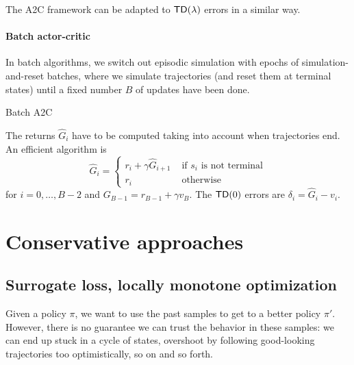 \documentclass[../course-notes.tex]{subfiles}
\begin{document}
The A2C framework can be adapted to $\mathsf{TD}(\lambda)$ errors in a similar way.


\paragraph{Batch actor-critic} In batch algorithms, we switch out episodic simulation with epochs of simulation-and-reset batches, where we simulate trajectories (and reset them at terminal states) until a fixed number $B$ of updates have been done.

\begin{algorithm}[H]
\caption{Batch A2C}\label{algo:BatchA2C}
\end{algorithm}

The returns $\widehat{G}_i$ have to be computed taking into account when trajectories end.
An efficient algorithm is
\[
	\widehat{G}_i =
	\begin{cases}
	r_i + \gamma \widehat{G}_{i+1}& \text{ if } s_i \text{ is not terminal} \\
	r_i & \text{ otherwise}
	\end{cases}
\]
for $i=0,\ldots,B-2$ and $G_{B-1} = r_{B-1} + \gamma v_B$. The $\mathsf{TD}(0)$ errors are $\delta_i = \widehat{G}_i - v_i$.


\section{Conservative approaches}

\subsection{Surrogate loss, locally monotone optimization}

Given a policy $\pi$, we want to use the past samples to get to a better policy $\pi'$. However, there is no guarantee we can trust the behavior in these samples: we can end up stuck in a cycle of states, overshoot by following good-looking trajectories too optimistically, so on and so forth.
\end{document}
